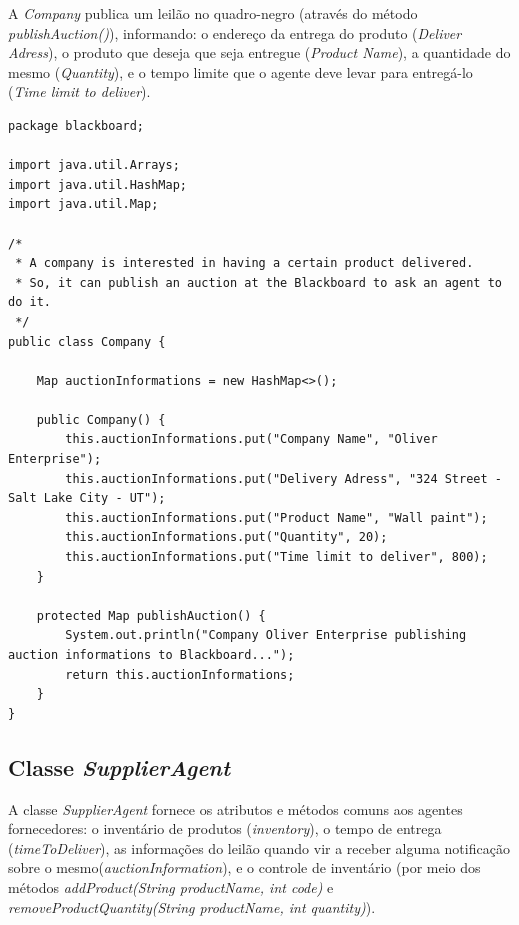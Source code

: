 A \textit{Company} publica um leilão no quadro-negro (através do método \textit{publishAuction()}), informando: o endereço da entrega do produto (\textit{Deliver Adress}), o produto que deseja que seja entregue (\textit{Product Name}), a quantidade do mesmo (\textit{Quantity}), e o tempo limite que o agente deve levar para entregá-lo (\textit{Time limit to deliver}).

\begin{lstlisting}
package blackboard;

import java.util.Arrays;
import java.util.HashMap;
import java.util.Map;

/*
 * A company is interested in having a certain product delivered.
 * So, it can publish an auction at the Blackboard to ask an agent to do it.
 */
public class Company {

	Map auctionInformations = new HashMap<>();
	
	public Company() {
		this.auctionInformations.put("Company Name", "Oliver Enterprise");
		this.auctionInformations.put("Delivery Adress", "324 Street - Salt Lake City - UT");
		this.auctionInformations.put("Product Name", "Wall paint");
		this.auctionInformations.put("Quantity", 20);
		this.auctionInformations.put("Time limit to deliver", 800);
	}
	
	protected Map publishAuction() {
		System.out.println("Company Oliver Enterprise publishing auction informations to Blackboard...");
		return this.auctionInformations;
	}
}
\end{lstlisting}

\subsection{Classe \textit{SupplierAgent}}

A classe \textit{SupplierAgent} fornece os atributos e métodos comuns aos agentes fornecedores: o inventário de produtos (\textit{inventory}), o tempo de entrega (\textit{timeToDeliver}), as informações do leilão quando vir a receber alguma notificação sobre o mesmo(\textit{auctionInformation}), e o controle de inventário (por meio dos métodos \textit{addProduct(String productName, int code)} e \textit{removeProductQuantity(String productName, int quantity)}).

